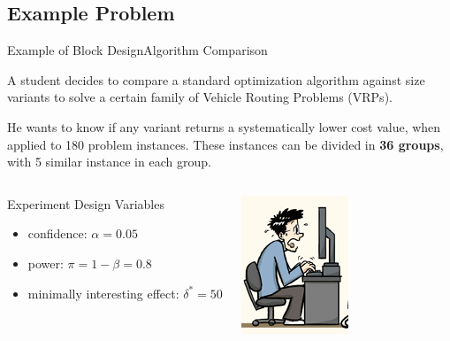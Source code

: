 \subsection{Example Problem}
\begin{frame}{Example of Block Design}{Algorithm Comparison}

  A student decides to compare a standard optimization algorithm against
  size variants to solve a certain family of Vehicle Routing Problems (VRPs).
  \bigskip

  He wants to know if any variant returns a systematically lower cost value,
  when applied to 180 problem instances. These instances can be divided in
  {\bf 36 groups}, with 5 similar instance in each group.


  \begin{columns}
    \begin{block}{Experiment Design Variables}
      \begin{itemize}
        \item confidence: $\alpha = 0.05$
        \item power: $\pi = 1 - \beta = 0.8$
        \item minimally interesting effect: $\delta^* = 50$
      \end{itemize}
    \end{block}
    \includegraphics[width=1\textwidth]{../img/phdStudent.png}
  \end{columns}
\end{frame}

